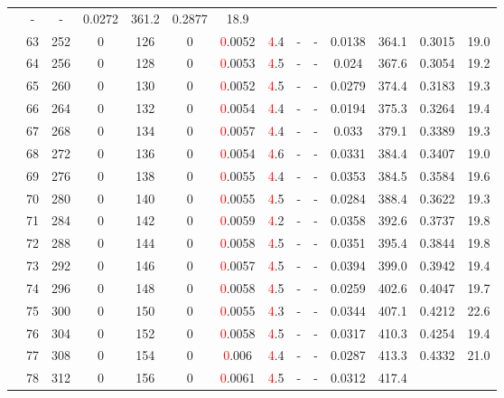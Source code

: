\begin{table}[htb]
{\begin{tabular}{|c|c|c|c|c|c|c|c|c|c|c|c|c|c|}
 & - & -
 & 0.0272 & 361.2
 & 0.2877 & 18.9
 \\
 & 
63 & 252 & 0 & 126 & 0
 & \textcolor{red}0.0052 & \textcolor{red}4.4
 & - & -
 & 0.0138 & 364.1
 & 0.3015 & 19.0
 \\
 & 
64 & 256 & 0 & 128 & 0
 & \textcolor{red}0.0053 & \textcolor{red}4.5
 & - & -
 & 0.024 & 367.6
 & 0.3054 & 19.2
 \\
 & 
65 & 260 & 0 & 130 & 0
 & \textcolor{red}0.0052 & \textcolor{red}4.5
 & - & -
 & 0.0279 & 374.4
 & 0.3183 & 19.3
 \\
 & 
66 & 264 & 0 & 132 & 0
 & \textcolor{red}0.0054 & \textcolor{red}4.4
 & - & -
 & 0.0194 & 375.3
 & 0.3264 & 19.4
 \\
 & 
67 & 268 & 0 & 134 & 0
 & \textcolor{red}0.0057 & \textcolor{red}4.4
 & - & -
 & 0.033 & 379.1
 & 0.3389 & 19.3
 \\
 & 
68 & 272 & 0 & 136 & 0
 & \textcolor{red}0.0054 & \textcolor{red}4.6
 & - & -
 & 0.0331 & 384.4
 & 0.3407 & 19.0
 \\
 & 
69 & 276 & 0 & 138 & 0
 & \textcolor{red}0.0055 & \textcolor{red}4.4
 & - & -
 & 0.0353 & 384.5
 & 0.3584 & 19.6
 \\
 & 
70 & 280 & 0 & 140 & 0
 & \textcolor{red}0.0055 & \textcolor{red}4.5
 & - & -
 & 0.0284 & 388.4
 & 0.3622 & 19.3
 \\
 & 
71 & 284 & 0 & 142 & 0
 & \textcolor{red}0.0059 & \textcolor{red}4.2
 & - & -
 & 0.0358 & 392.6
 & 0.3737 & 19.8
 \\
 & 
72 & 288 & 0 & 144 & 0
 & \textcolor{red}0.0058 & \textcolor{red}4.5
 & - & -
 & 0.0351 & 395.4
 & 0.3844 & 19.8
 \\
 & 
73 & 292 & 0 & 146 & 0
 & \textcolor{red}0.0057 & \textcolor{red}4.5
 & - & -
 & 0.0394 & 399.0
 & 0.3942 & 19.4
 \\
 & 
74 & 296 & 0 & 148 & 0
 & \textcolor{red}0.0058 & \textcolor{red}4.5
 & - & -
 & 0.0259 & 402.6
 & 0.4047 & 19.7
 \\
 & 
75 & 300 & 0 & 150 & 0
 & \textcolor{red}0.0055 & \textcolor{red}4.3
 & - & -
 & 0.0344 & 407.1
 & 0.4212 & 22.6
 \\
 & 
76 & 304 & 0 & 152 & 0
 & \textcolor{red}0.0058 & \textcolor{red}4.5
 & - & -
 & 0.0317 & 410.3
 & 0.4254 & 19.4
 \\
 & 
77 & 308 & 0 & 154 & 0
 & \textcolor{red}0.006 & \textcolor{red}4.4
 & - & -
 & 0.0287 & 413.3
 & 0.4332 & 21.0
 \\
 & 
78 & 312 & 0 & 156 & 0
 & \textcolor{red}0.0061 & \textcolor{red}4.5
 & - & -
 & 0.0312 & 417.4

\end{tabular}}
\end{table}
